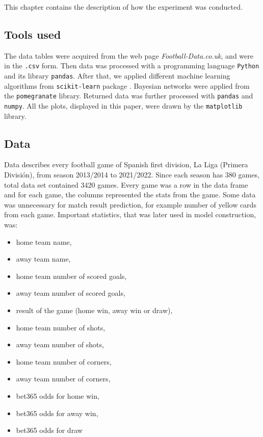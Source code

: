 \documentclass[conference]{IEEEtran}
\begin{document}
This chapter contains the description of how the experiment was conducted.

\subsection{Tools used}

The data tables were acquired from the web page \emph{Football-Data.co.uk}, and were in the
\texttt{.csv} form. Then data was processed with a programming language \texttt{Python} and 
its library \texttt{pandas}. After that, we applied different machine learning algorithms from
\texttt{scikit-learn} package \cite{scikit-learn}. Bayesian networks were applied 
from the \texttt{pomegranate} library. Returned data was further processed 
with \texttt{pandas} and \texttt{numpy}. All the plots, displayed in this paper, were drawn by the 
\texttt{matplotlib} library.

\subsection{Data}

Data describes every football game of Spanish first division, La Liga (Primera División), 
from season 2013/2014 to 2021/2022. Since each season has 380 games, total data set contained 
3420 games. Every game was a row in the data frame and for each game, the columns represented 
the stats from the game. Some data was unnecessary for match result prediction, for example
number of yellow cards from each game. Important statistics, that was later used in 
model construction, was:
\begin{itemize}
    \item home team name,
    \item away team name,
    \item home team number of scored goals,
    \item away team number of scored goals,
    \item result of the game (home win, away win or draw),
    \item home team number of shots,
    \item away team number of shots,
    \item home team number of corners,
    \item away team number of corners,
    \item bet365 odds for home win,
    \item bet365 odds for away win,
    \item bet365 odds for draw
\end{itemize}
\end{document}
